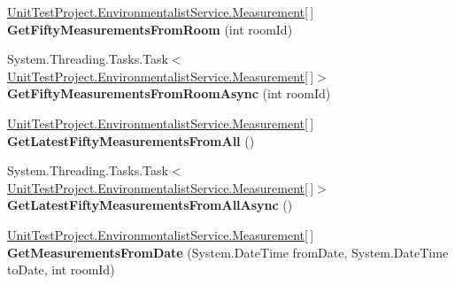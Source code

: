 \begin{DoxyCompactItemize}
\item 
\hypertarget{class_unit_test_project_1_1_environmentalist_service_1_1_service1_client_a9b4ce0997fc5bba42ceaf7a5d9e06781}{}\hyperlink{class_unit_test_project_1_1_environmentalist_service_1_1_measurement}{Unit\+Test\+Project.\+Environmentalist\+Service.\+Measurement}\mbox{[}$\,$\mbox{]} {\bfseries Get\+Fifty\+Measurements\+From\+Room} (int room\+Id)\label{class_unit_test_project_1_1_environmentalist_service_1_1_service1_client_a9b4ce0997fc5bba42ceaf7a5d9e06781}

\item 
\hypertarget{class_unit_test_project_1_1_environmentalist_service_1_1_service1_client_a8fe3e11acc5ac2243a2a545bf62056b7}{}System.\+Threading.\+Tasks.\+Task$<$ \hyperlink{class_unit_test_project_1_1_environmentalist_service_1_1_measurement}{Unit\+Test\+Project.\+Environmentalist\+Service.\+Measurement}\mbox{[}$\,$\mbox{]}$>$ {\bfseries Get\+Fifty\+Measurements\+From\+Room\+Async} (int room\+Id)\label{class_unit_test_project_1_1_environmentalist_service_1_1_service1_client_a8fe3e11acc5ac2243a2a545bf62056b7}

\item 
\hypertarget{class_unit_test_project_1_1_environmentalist_service_1_1_service1_client_ac65ef4fef4d37097e9a6b5e3372aa208}{}\hyperlink{class_unit_test_project_1_1_environmentalist_service_1_1_measurement}{Unit\+Test\+Project.\+Environmentalist\+Service.\+Measurement}\mbox{[}$\,$\mbox{]} {\bfseries Get\+Latest\+Fifty\+Measurements\+From\+All} ()\label{class_unit_test_project_1_1_environmentalist_service_1_1_service1_client_ac65ef4fef4d37097e9a6b5e3372aa208}

\item 
\hypertarget{class_unit_test_project_1_1_environmentalist_service_1_1_service1_client_ac7d9a2a6677c58384a1f4806f98b8454}{}System.\+Threading.\+Tasks.\+Task$<$ \hyperlink{class_unit_test_project_1_1_environmentalist_service_1_1_measurement}{Unit\+Test\+Project.\+Environmentalist\+Service.\+Measurement}\mbox{[}$\,$\mbox{]}$>$ {\bfseries Get\+Latest\+Fifty\+Measurements\+From\+All\+Async} ()\label{class_unit_test_project_1_1_environmentalist_service_1_1_service1_client_ac7d9a2a6677c58384a1f4806f98b8454}

\item 
\hypertarget{class_unit_test_project_1_1_environmentalist_service_1_1_service1_client_a96c5f4bd47b4f4727e34da9c0671fd48}{}\hyperlink{class_unit_test_project_1_1_environmentalist_service_1_1_measurement}{Unit\+Test\+Project.\+Environmentalist\+Service.\+Measurement}\mbox{[}$\,$\mbox{]} {\bfseries Get\+Measurements\+From\+Date} (System.\+Date\+Time from\+Date, System.\+Date\+Time to\+Date, int room\+Id)\label{class_unit_test_project_1_1_environmentalist_service_1_1_service1_client_a96c5f4bd47b4f4727e34da9c0671fd48}


\end{DoxyCompactItemize}
